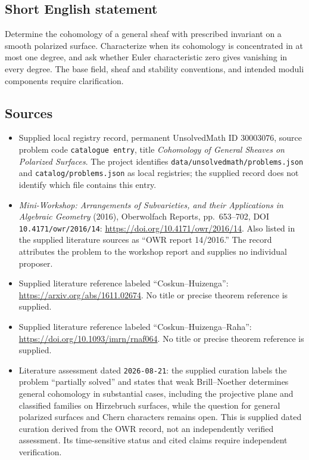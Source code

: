 \documentclass[11pt]{article}
\begin{document}
\subsection{Short English statement}
Determine the cohomology of a general sheaf with prescribed invariant on a smooth polarized surface. Characterize when its cohomology is concentrated in at most one degree, and ask whether Euler characteristic zero gives vanishing in every degree. The base field, sheaf and stability conventions, and intended moduli components require clarification.
\subsection{Sources}
\begin{itemize}
\item Supplied local registry record, permanent UnsolvedMath ID \(30003076\), source problem code \texttt{catalogue entry}, title \emph{Cohomology of General Sheaves on Polarized Surfaces}. The project identifies \texttt{data/unsolvedmath/problems.json} and \texttt{catalog/problems.json} as local registries; the supplied record does not identify which file contains this entry.
\item \emph{Mini-Workshop: Arrangements of Subvarieties, and their Applications in Algebraic Geometry} (2016), Oberwolfach Reports, pp.\ 653--702, DOI \texttt{10.4171/owr/2016/14}: \url{https://doi.org/10.4171/owr/2016/14}. Also listed in the supplied literature sources as ``OWR report 14/2016.'' The record attributes the problem to the workshop report and supplies no individual proposer.
\item Supplied literature reference labeled ``Coskun--Huizenga'': \url{https://arxiv.org/abs/1611.02674}. No title or precise theorem reference is supplied.
\item Supplied literature reference labeled ``Coskun--Huizenga--Raha'': \url{https://doi.org/10.1093/imrn/rnaf064}. No title or precise theorem reference is supplied.
\item Literature assessment dated \texttt{2026-08-21}: the supplied curation labels the problem ``partially solved'' and states that weak Brill--Noether determines general cohomology in substantial cases, including the projective plane and classified families on Hirzebruch surfaces, while the question for general polarized surfaces and Chern characters remains open. This is supplied dated curation derived from the OWR record, not an independently verified assessment. Its time-sensitive status and cited claims require independent verification.
\end{itemize}
\end{document}
